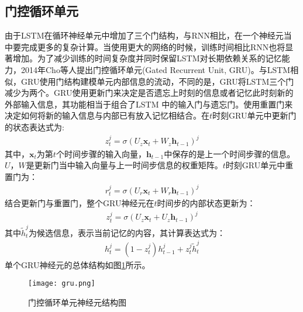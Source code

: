 \subsection{门控循环单元}
由于LSTM在循环神经单元中增加了三个门结构，与RNN相比，在一个神经元当中要完成更多的复杂计算。当使用更大的网络的时候，训练时间相比RNN也将显著增加。为了减少训练的时间复杂度并同时保留LSTM对长期依赖关系的记忆能力，2014年Cho等人提出门控循环单元(Gated Recurrent Unit, GRU)。与LSTM相似，GRU使用门结构建模单元内部信息的流动，不同的是，GRU将LSTM三个门减少为两个。GRU使用更新门来决定是否遗忘上时刻的信息或者记忆此时刻新的外部输入信息，其功能相当于组合了LSTM 中的输入门与遗忘门。使用重置门来决定如何将新的输入信息与内部已有放入记忆相结合。在$t$时刻GRU单元中更新门的状态表达式为:
\begin{align} 
z_{t}^{j}=\sigma\left(U_{z} \mathbf{x}_{t}+W_{z} \mathbf{h}_{t-1}\right)^{j}
\end{align}
其中，$\mathbf{x}_{t}$为第$t$个时间步骤的输入向量，$\mathbf{h}_{t-1}$中保存的是上一个时间步骤的信息。$U$，$W$是更新门当中输入向量与上一时间步信息的权重矩阵。$t$时刻GRU单元中重置门为：
\begin{align} 
r_{t}^{j}=\sigma\left(U_{r} \mathbf{x}_{t}+W_{r} \mathbf{h}_{t-1}\right)^{j}
\end{align}
结合更新门与重置门，整个GRU神经元在$t$时间步的内部状态更新为：
\begin{align} 
z_{t}^{j}=\sigma\left(U_{z} \mathbf{x}_{t}+U_{z} \mathbf{h}_{t-1}\right)^{j}
\end{align}
其中$\tilde{h}_{t}^{j}$为候选信息，表示当前记忆的内容，其计算表达式为：
\begin{align} 
h_{t}^{j}=\left(1-z_{t}^{j}\right) h_{t-1}^{j}+z_{t}^{j} \tilde{h}_{t}^{j}
\end{align}
单个GRU神经元的总体结构如图\ref{fig:gru}所示。
\begin{figure}[htb]
  \centering
  \texttt{[image: gru.png]}\\
  \caption{门控循环单元神经元结构图}
  \label{fig:gru}
\end{figure}
